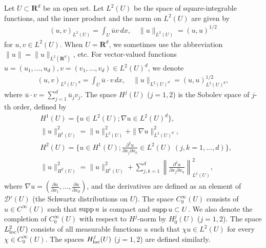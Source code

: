 \documentclass[12pt,a4paper]{article}
\def\supp{\mathop{\rm supp}\nolimits}
\begin{document}
Let $U\subset \mathbf{R}^d$ be an open set.
Let $L^2(U)$ be the space of square-integrable functions,
and the inner product and the norm on $L^2(U)$
are given by 
\begin{align*}
 (u,v)_{L^2(U)}=\int_U \overline{u}v\,dx,\quad
\|u\|_{L^2(U)}=(u,u)^{1/2}
\end{align*}
for $u,v\in L^2(U)$.
When $U=\mathbf{R}^d$,
we sometimes use the abbreviation 
$\|u\|=\|u\|_{L^2(\mathbf{R}^d)}$, etc.
For vector-valued functions 
$u=(u_1,...,u_d),v=(v_1,...,v_d)\in L^2(U)^d$,
we denote
\begin{align*}
 (u,v)_{L^2(U)^d}=\int_U \overline{u}\cdot v\,dx,\quad
\|u\|_{L^2(U)^d}=(u,u)_{L^2(U)^d}^{1/2},
\end{align*}
where $\overline{u}\cdot v=\sum_{j=1}^d \overline{u}_jv_j$.
The space $H^j(U)$ ($j=1,2$) is the Sobolev space 
of $j$-th order, defined by
\begin{align*}
& H^1(U)=
\{u\in L^2(U);\nabla u \in L^2(U)^d\},\\
&\|u\|_{H^1(U)}^2
=
\|u\|_{L^2(U)}^2
+
\|\nabla u\|_{L^2(U)^d}^2,\\
&H^2(U)=\{u\in H^1(U);\frac{\partial^2 u}{\partial x_j\partial x_k}\in L^2(U)\ (j,k=1,...,d)\},\\
&\|u\|_{H^2(U)}^2=\|u\|_{H^1(U)}^2+\sum_{j,k=1}^d
\left\|\frac{\partial^2 u}{\partial x_j\partial x_k}\right\|_{L^2(U)}^2,
\end{align*}
where 
$\nabla u = (\frac{\partial u}{\partial x_1},...,\frac{\partial u}{\partial x_d})$,
and the derivatives are defined
as an element of $\mathcal{D}'(U)$
(the Schwartz distributions on $U$).
The space $C_0^\infty(U)$ consists of $u\in C^\infty(U)$ such that
$\supp u$ is compact and $\supp u\subset U$.
We also denote 
the completion of $C_0^\infty(U)$ with respect to
$H^j$-norm by $H^j_0(U)$ ($j=1,2$).
The space $L^2_{\rm loc}(U)$ consists of all 
measurable functions $u$
such that $\chi u\in L^2(U)$ for every $\chi\in C_0^\infty(U)$.
The spaces $H^j_{\rm loc}(U)$ ($j=1,2$) are defined similarly.
\end{document}
